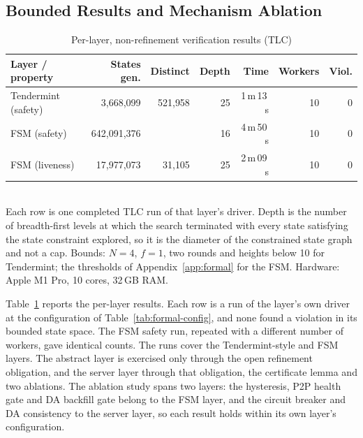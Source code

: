 \subsection{Bounded Results and Mechanism Ablation}


\begin{table}[tbp]
\caption{Per-layer, non-refinement verification results (TLC)}
\label{tab:formal-verification}
\centering
\footnotesize
\begin{tabular}{@{}lrrrrrr@{}}
\toprule
\textbf{Layer / property} & \textbf{States gen.} & \textbf{Distinct} & \textbf{Depth} & \textbf{Time} & \textbf{Workers} & \textbf{Viol.} \\
\midrule
Tendermint (safety) & 3{,}668{,}099 & 521{,}958 & 25 & 1\,m\,13\,s & 10 & 0 \\
FSM (safety) & 642{,}091{,}376 & \resFSMStatesExact{} & 16 & 4\,m\,50\,s & 10 & 0 \\
FSM (liveness) & 17{,}977{,}073 & 31{,}105 & 25 & 2\,m\,09\,s & 10 & 0 \\
\bottomrule
\end{tabular}
\\[2pt]
\footnotesize Each row is one completed TLC run of that layer's driver. Depth is
the number of breadth-first levels at which the search terminated with every
state satisfying the state constraint explored, so it is the diameter of the
constrained state graph and not a cap. Bounds: $N{=}4$, $f{=}1$, two rounds and
heights below 10 for Tendermint; the thresholds of Appendix~\ref{app:formal} for
the FSM. Hardware: Apple M1 Pro, 10 cores, 32\,GB RAM.
\end{table}

Table~\ref{tab:formal-verification} reports the per-layer results. Each row is a
run of the layer's own driver at the configuration of
Table~\ref{tab:formal-config}, and none found a violation in its bounded state space.
The FSM safety run, repeated with a different number of workers, gave identical
counts. The runs cover the Tendermint-style and FSM layers. The abstract layer is
exercised only through the open refinement obligation, and the server layer through
that obligation, the certificate lemma and two ablations. The ablation study spans
two layers: the hysteresis, P2P health gate and DA backfill gate belong to the FSM
layer, and the circuit breaker and DA consistency to the server layer, so each
result holds within its own layer's configuration.

